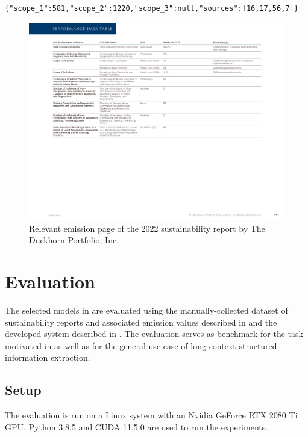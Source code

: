 \documentclass[]{article}
\begin{document}
\begin{lstlisting}[label=output.example,caption={Example output.}]
{"scope_1":581,"scope_2":1220,"scope_3":null,"sources":[16,17,56,7]}
\end{lstlisting}

\begin{figure}
	\includegraphics[width=\textwidth]{graphics/example-report-page}
	\caption{Relevant emission page of the 2022 sustainability report by The Duckhorn Portfolio, Inc.}
	\label{fig:example.report.page}
\end{figure}

\section{Evaluation}
\label{sec:eval}

The selected models in  are evaluated using the manually-collected dataset of sustainability reports and associated emission values described in  and the developed system described in . The evaluation serves as benchmark for the task motivated in  as well as for the general use case of long-context structured information extraction.

\subsection{Setup}

The evaluation is run on a Linux system with an Nvidia GeForce RTX 2080 Ti GPU. Python 3.8.5 and CUDA 11.5.0 are used to run the experiments.
\end{document}
